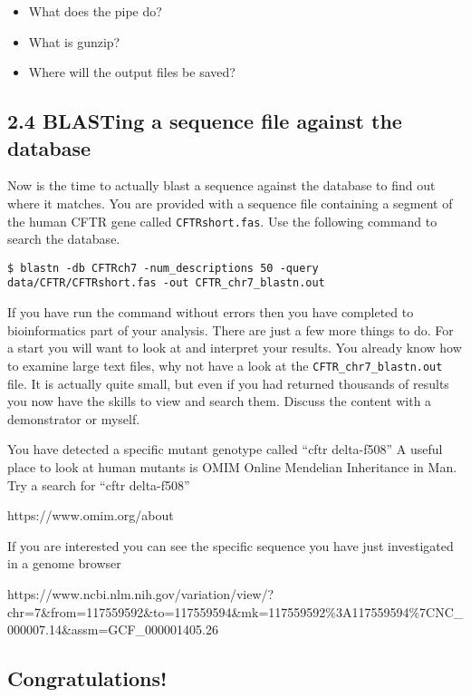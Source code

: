 \documentclass[11pt]{article}
\providecommand{\tightlist}{%
      \setlength{\itemsep}{0pt}\setlength{\parskip}{0pt}}
\begin{document}
    \begin{itemize}
\tightlist
\item
  What does the pipe \textbar{} do?
\item
  What is gunzip?
\item
  Where will the output files be saved?
\end{itemize}

    \hypertarget{blasting-a-sequence-file-against-the-database}{%
\subsection{2.4 BLASTing a sequence file against the
database}\label{blasting-a-sequence-file-against-the-database}}

Now is the time to actually blast a sequence against the database to
find out where it matches. You are provided with a sequence file
containing a segment of the human CFTR gene called
\texttt{CFTRshort.fas}. Use the following command to search the
database.

\begin{verbatim}
$ blastn -db CFTRch7 -num_descriptions 50 -query data/CFTR/CFTRshort.fas -out CFTR_chr7_blastn.out
\end{verbatim}

    If you have run the command without errors then you have completed to
bioinformatics part of your analysis. There are just a few more things
to do. For a start you will want to look at and interpret your results.
You already know how to examine large text files, why not have a look at
the \texttt{CFTR\_chr7\_blastn.out} file. It is actually quite small,
but even if you had returned thousands of results you now have the
skills to view and search them. Discuss the content with a demonstrator
or myself.

    You have detected a specific mutant genotype called ``cftr delta-f508''
A useful place to look at human mutants is OMIM Online Mendelian
Inheritance in Man. Try a search for ``cftr delta-f508''

https://www.omim.org/about

If you are interested you can see the specific sequence you have just
investigated in a genome browser

https://www.ncbi.nlm.nih.gov/variation/view/?chr=7\&from=117559592\&to=117559594\&mk=117559592\%3A117559594\%7CNC\_000007.14\&assm=GCF\_000001405.26

    \hypertarget{congratulations}{%
\subsection{Congratulations!}\label{congratulations}}
\end{document}
